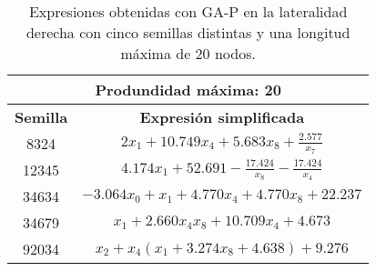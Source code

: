 \begin{table}[H]
\centering
\begin{tabular}{|c|c|}
\hline
\multicolumn{2}{|c|}{\textbf{Produndidad máxima: 20}}                                                                 \\ \hline
\textbf{Semilla} & \textbf{Expresión simplificada}                                                                    \\ \hline
8324             & $2 x_{1} + 10.749 x_{4} + 5.683 x_{8} + \frac{2.577}{x_{7}}$                              \\ \hline
12345            & $4.174 x_{1} + 52.691 - \frac{17.424}{x_{8}} - \frac{17.424}{x_{4}}$ \\ \hline
34634            & $- 3.064 x_{0} + x_{1} + 4.770 x_{4} + 4.770 x_{8} + 22.237$            \\ \hline
34679            & $x_{1} + 2.660 x_{4} x_{8} + 10.709 x_{4} + 4.673$                                  \\ \hline
92034            & $x_{2} + x_{4} \left(x_{1} + 3.274 x_{8} + 4.638\right) + 9.276$                          \\ \hline
\end{tabular}%
\caption{Expresiones obtenidas con GA-P en la lateralidad derecha con cinco semillas distintas y una longitud máxima de 20 nodos.}\label{table:exp_GAP_l1_20}

\end{table}




